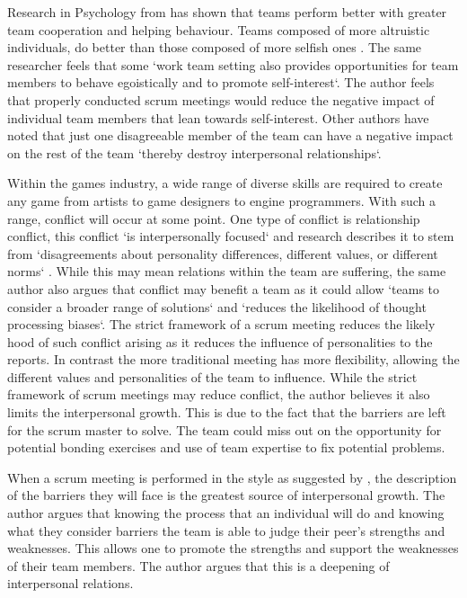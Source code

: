 \documentclass{scrartcl}
\begin{document}
Research in Psychology from \cite{li2014toward} has shown that teams perform better with greater team cooperation and helping behaviour. Teams composed of more altruistic individuals, do better than those composed of more selfish ones \cite[p. 542]{li2014toward}.  The same researcher feels that some `work team setting also provides opportunities for team members to behave egoistically and to promote self-interest`\cite[p. 542]{li2014toward}. The author feels that properly conducted scrum meetings would reduce the negative impact of individual team members that lean towards self-interest. Other authors have noted that just one disagreeable member of the team can have a negative impact on the rest of the team `thereby destroy interpersonal relationships`\cite[p. 381] {barrick1998relating}.

Within the games industry, a wide range of diverse skills are required to create any game from artists to game designers to engine programmers. With such a range, conflict will occur at some point\cite{gorse2007communication}. One type of conflict is relationship conflict, this conflict `is interpersonally focused` \cite [p. 215]{costa2015direct} and research describes it to stem from `disagreements about personality differences, different values, or different norms` \cite [p. 215]{costa2015direct}. While this may mean relations within the team are suffering, the same author also argues that conflict may benefit a team as it could allow `teams to consider a broader range of solutions` and `reduces the likelihood of thought processing biases`\cite [p. 215]{costa2015direct}. The strict framework of a scrum meeting reduces the likely hood of such conflict arising as it reduces the influence of personalities to the reports. In contrast the more traditional meeting \cite{costa2015direct, gorse2007communication}  has more flexibility, allowing the different values and personalities of the team to influence. While the strict framework of scrum meetings may reduce conflict, the author believes it also limits the interpersonal growth. This is due to the fact that the barriers are left for the scrum master to solve. The team could miss out on the opportunity for potential bonding exercises and use of team expertise to fix potential problems.

When a scrum meeting is performed in the style as suggested by \cite{AgileScrum}, the description of the barriers they will face is the greatest source of interpersonal growth. The author argues that knowing the process that an individual will do and knowing what they consider barriers the team is able to judge their peer’s strengths and weaknesses. This allows one to promote the strengths and support the weaknesses of their team members. The author argues that this is a deepening of interpersonal relations.
\end{document}
